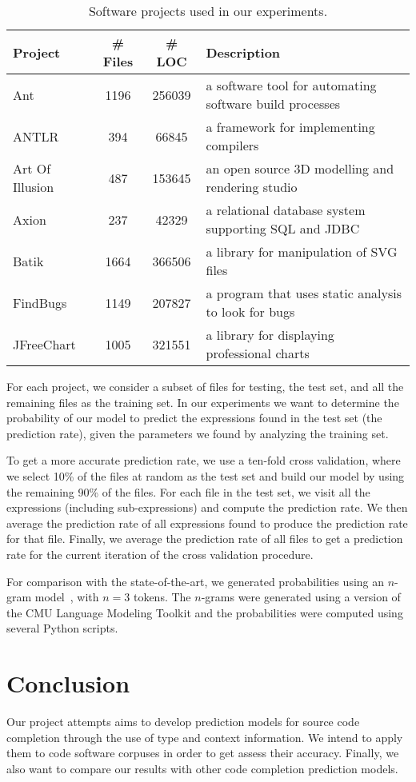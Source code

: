 \documentclass{article} %
\begin{document}
\begin{table}[ht]
\centering
\begin{tabular}{|l|c|c|l|}
\hline
\textbf{Project} & \textbf{\# Files} & \textbf{\# LOC} & \textbf{Description} \\
\hline
Ant & 1196 & 256039 & a software tool for automating software build processes \\
ANTLR & 394 & 66845 & a framework for implementing compilers \\
Art Of Illusion & 487 & 153645 & an open source 3D modelling and rendering studio \\
Axion & 237 & 42329 & a relational database system supporting SQL and JDBC \\
Batik & 1664 & 366506 & a library for manipulation of SVG files \\
FindBugs & 1149 & 207827 & a program that uses static analysis to look for bugs \\
JFreeChart & 1005 & 321551 & a library for displaying professional charts \\
\hline
\end{tabular}
\caption{Software projects used in our experiments.}
\label{tab:projects}
\end{table}

For each project, we consider a subset of files for testing, the test set, and all the remaining files as the training set.
In our experiments we want to determine the probability of our model to predict the expressions found in the test set (the prediction rate), given the parameters we found by analyzing the training set.

To get a more accurate prediction rate, we use a ten-fold cross validation, where we select 10\% of the files at random as the test set and build our model by using the remaining 90\% of the files. For each file in the test set, we visit all the expressions (including sub-expressions) and compute the prediction rate. We then average the prediction rate of all expressions found to produce the prediction rate for that file. Finally, we average the prediction rate of all files to get a prediction rate for the current iteration of the cross validation procedure.

For comparison with the state-of-the-art, we generated probabilities using an $n$-gram model~\cite{Hindle:2012:NS:2337223.2337322}, with $n = 3$ tokens. The $n$-grams were generated using a version of the CMU Language Modeling Toolkit and the probabilities were computed using several Python scripts.

\section*{Conclusion}

Our project attempts aims to develop prediction models for source code completion through the use of type and context information. We intend to apply them to code software corpuses in order to get assess their accuracy. Finally, we also want to compare our results with other code completion prediction models.




\end{document}

